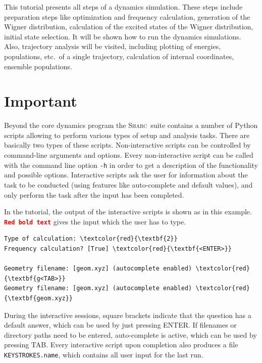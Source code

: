 \documentclass[a4paper,11pt,DIV=15,openany]{scrbook}
\newcommand{\sharc}{\textsc{Sharc}}
\newcommand{\ttt}[1]{\texttt{#1}}
\begin{document}
This tutorial presents all steps of a dynamics simulation. These steps include preparation steps like optimization and frequency calculation, generation of the Wigner distribution, calculation of the excited states of the Wigner distribution, initial state selection. It will be shown how to run the dynamics simulations. Also, trajectory analysis will be visited, including plotting of energies, populations, etc.\ of a single trajectory, calculation of internal coordinates, ensemble populations.


\section{Important}

Beyond the core dynamics program the \sharc\ suite contains a number of Python scripts allowing to perform various types of setup and analysis tasks. 
There are basically two types of these scripts.
Non-interactive scripts can be controlled by command-line arguments and options. Every non-interactive script can be called with the command line option \ttt{-h} in order to get a description of the functionality and possible options.
Interactive scripts ask the user for information about the task to be conducted (using features like auto-complete and default values), and only perform the task after the input has been completed. 

In the tutorial, the output of the interactive scripts is shown as in this example. 
\texttt{\textcolor{red}{\textbf{Red bold text}}} gives the input which the user has to type. 
\begin{oframed}
\footnotesize\begin{Verbatim}[commandchars=\\\{\}]
Type of calculation: \textcolor{red}{\textbf{2}}
Frequency calculation? [True] \textcolor{red}{\textbf{<ENTER>}}

Geometry filename: [geom.xyz] (autocomplete enabled) \textcolor{red}{\textbf{g<TAB>}}
Geometry filename: [geom.xyz] (autocomplete enabled) \textcolor{red}{\textbf{geom.xyz}}
\end{Verbatim}
\end{oframed}

\normalsize
During the interactive sessions, square brackets indicate that the question has a default answer, which can be used by just pressing ENTER. If filenames or directory paths need to be entered, auto-complete is active, which can be used by pressing TAB. Every interactive script upon completion also produces a file \ttt{KEYSTROKES.name}, which contains all user input for the last run.
\end{document}
